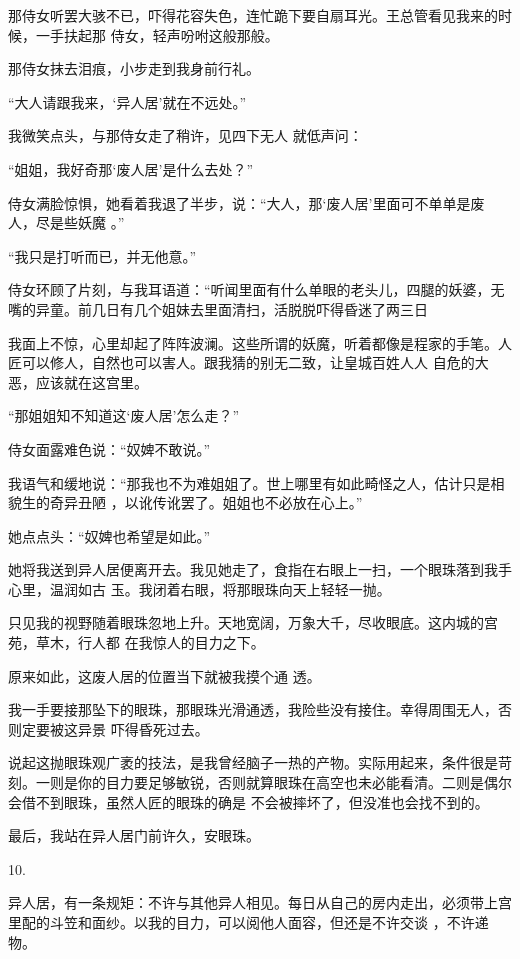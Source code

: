 \documentclass{article}
\begin{document}
那侍女听罢大骇不已，吓得花容失色，连忙跪下要自扇耳光。王总管看见我来的时候，一手扶起那
侍女，轻声吩咐这般那般。 


那侍女抹去泪痕，小步走到我身前行礼。 

“大人请跟我来，‘异人居’就在不远处。”

我微笑点头，与那侍女走了稍许，见四下无人
就低声问： 

\newpage

“姐姐，我好奇那‘废人居’是什么去处？”

侍女满脸惊惧，她看着我退了半步，说：“大人，那‘废人居’里面可不单单是废人，尽是些妖魔
。” 


“我只是打听而已，并无他意。” 

侍女环顾了片刻，与我耳语道：“听闻里面有什么单眼的老头儿，四腿的妖婆，无嘴的异童。前几日有几个姐妹去里面清扫，活脱脱吓得昏迷了两三日

我面上不惊，心里却起了阵阵波澜。这些所谓的妖魔，听着都像是程家的手笔。人匠可以修人，自然也可以害人。跟我猜的别无二致，让皇城百姓人人
自危的大恶，应该就在这宫里。 


“那姐姐知不知道这‘废人居’怎么走？” 


侍女面露难色说：“奴婢不敢说。” 

\newpage

我语气和缓地说：“那我也不为难姐姐了。世上哪里有如此畸怪之人，估计只是相貌生的奇异丑陋
，以讹传讹罢了。姐姐也不必放在心上。” 


她点点头：“奴婢也希望是如此。” 

她将我送到异人居便离开去。我见她走了，食指在右眼上一扫，一个眼珠落到我手心里，温润如古
玉。我闭着右眼，将那眼珠向天上轻轻一抛。 

只见我的视野随着眼珠忽地上升。天地宽阔，万象大千，尽收眼底。这内城的宫苑，草木，行人都
在我惊人的目力之下。 

原来如此，这废人居的位置当下就被我摸个通
透。 

我一手要接那坠下的眼珠，那眼珠光滑通透，我险些没有接住。幸得周围无人，否则定要被这异景
吓得昏死过去。 

\newpage

说起这抛眼珠观广袤的技法，是我曾经脑子一热的产物。实际用起来，条件很是苛刻。一则是你的目力要足够敏锐，否则就算眼珠在高空也未必能看清。二则是偶尔会借不到眼珠，虽然人匠的眼珠的确是
不会被摔坏了，但没准也会找不到的。 


最后，我站在异人居门前许久，安眼珠。 


10. 

异人居，有一条规矩：不许与其他异人相见。每日从自己的房内走出，必须带上宫里配的斗笠和面纱。以我的目力，可以阅他人面容，但还是不许交谈
，不许递物。 
\end{document}
